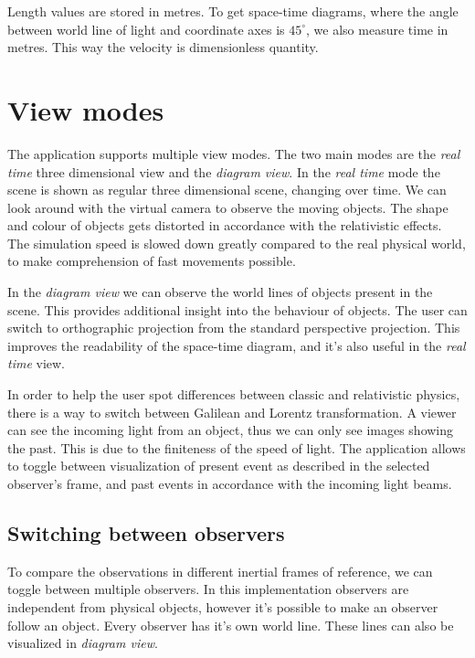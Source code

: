 \documentclass{egpubl}
\begin{document}
Length values are stored in metres. To get space-time diagrams, where the angle between world line of light and coordinate axes is $45^{\circ}$, we also measure time in metres. This way the velocity is dimensionless quantity.

\section{View modes}
The application supports multiple view modes. The two main modes are the \emph{real time} three dimensional view and the \emph{diagram view}. In the \emph{real time} mode the scene is shown as regular three dimensional scene, changing over time. We can look around with the virtual camera to observe the moving objects. The shape and colour of objects gets distorted in accordance with the relativistic effects. The simulation speed is slowed down greatly compared to the real physical world, to make comprehension of fast movements possible.


In the \emph{diagram view} we can observe the world lines of objects present in the scene. This provides additional insight into the behaviour of objects. The user can switch to orthographic projection from the standard perspective projection. This improves the readability of the space-time diagram, and it's also useful in the \emph{real time} view.

In order to help the user spot differences between classic and relativistic physics, there is a way to switch between Galilean \cite{KHGalilei} and Lorentz transformation. A viewer can see the incoming light from an object, thus we can only see images showing the past. This is due to the finiteness of the speed of light. The application allows to toggle between visualization of present event as described in the selected observer's frame, and past events in accordance with the incoming light beams.

\subsection{Switching between observers}
To compare the observations in different inertial frames of reference, we can toggle between multiple observers. In this implementation observers are independent from physical objects, however it's possible to make an observer follow an object. Every observer has it's own world line. These lines can also be visualized in \emph{diagram view}.
\end{document}
